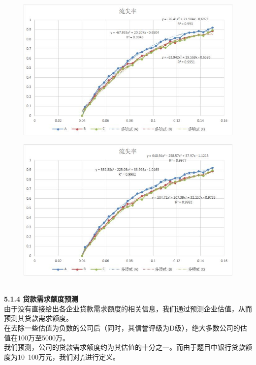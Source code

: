 \documentclass[bwprint]{cumcm}
\begin{document}
 \begin{figure}[h]%
	\centering  %
	\includegraphics[width=1\linewidth]{figures/figure12.jpg}  %
	\label{fig:mcmthesis-logo}   %
\end{figure}

 \begin{figure}[h]%
	\centering  %
	\includegraphics[width=1\linewidth]{figures/figure13.jpg}  %
	\label{fig:mcmthesis-logo}   %
\end{figure}
\\
\newpage
\noindent \textbf{ 5.1.4 贷款需求额度预测}\\
由于没有直接给出各企业贷款需求额度的相关信息，我们通过预测企业估值，从而预测其贷款需求额度。\\
在去除一些估值为负数的公司后（同时，其信誉评级为D级），绝大多数公司的估值在100万至5000万。\\
我们预测，公司的贷款需求额度约为其估值的十分之一。而由于题目中银行贷款额度为10~100万元，我们对$f_i$进行定义。
\\
\end{document}
